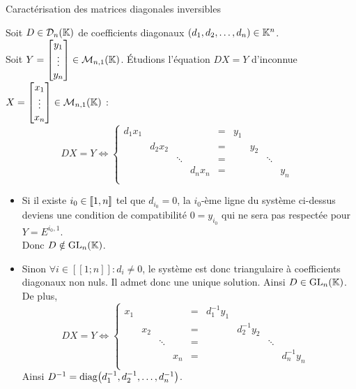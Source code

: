 \documentclass{article}
\begin{document}
\begin{question_kholle}
	{Caractérisation des matrices diagonales inversibles}

	Soit $D \in \mathcal{D}_n(\mathbb K)$ de coefficients diagonaux $(d_1, d_2, \ldots, d_n) \in \mathbb K^n$. \\
	Soit $Y = \begin{bmatrix} y_1 \\ \vdots \\ y_n \end{bmatrix} \in \mathcal{M}_{n,1}(\mathbb K)$.
	\'Etudions l'équation $DX = Y$ d'inconnue $X = \begin{bmatrix} x_1 \\ \vdots \\ x_n \end{bmatrix} \in \mathcal{M}_{n,1}(\mathbb K)$ :
	\begin{equation*}
		DX = Y \iff
		\left\{ \begin{array}{cccccccccc}
			d_1 x_1 &         &        &         & = & y_1 &     &        &       \\
			        & d_2 x_2 &        &         & = &     & y_2 &        &     & \\
			        &         & \ddots &         & = &     &     & \ddots &       \\
			        &         &        & d_n x_n & = &     &     &        & y_n   \\
		\end{array} \right.
	\end{equation*}

	\begin{itemize}
		\item Si il existe $i_0 \in [\![ 1,n ]\!]$ tel que $d_{i_0} = 0$, la $i_0$-ème ligne du système ci-dessus deviens une condition de compatibilité $0 = y_{i_0}$ qui ne sera pas respectée pour $Y = E^{i_0,1}$.\\
		      Donc $D \notin \mathrm{GL}_{n}(\mathbb K)$.
		\item Sinon $\forall i \in [\![1;n]\!] : d_i \neq 0$, le système est donc triangulaire à coefficients diagonaux non nuls. Il admet donc une unique solution. Ainsi $D \in \mathrm{GL}_{n}(\mathbb K)$. De plus,
		      \begin{equation*}
			      DX = Y \iff
			      \left\{ \begin{array}{cccccccccc}
				      x_1 &     &        &     & = & d_1^{-1} y_1 &              &        &                \\
				          & x_2 &        &     & = &              & d_2^{-1} y_2 &        &              & \\
				          &     & \ddots &     & = &              &              & \ddots &                \\
				          &     &        & x_n & = &              &              &        & d_n^{-1} y_n   \\
			      \end{array} \right.
		      \end{equation*}
		      Ainsi $D^{-1} = \operatorname{diag}\!\left(d_1^{-1}, d_2^{-1}, \ldots, d_n^{-1}\right)$.
	\end{itemize}
\end{question_kholle}
\end{document}
